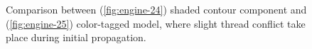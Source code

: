\documentclass[11pt, b5paper]{report}
\begin{document}
\begin{figure}[h!]
  \centering
  \caption[Comparison between shaded and color-tagged model]
  {Comparison between (\ref{fig:engine-24}) shaded contour component and 
    (\ref{fig:engine-25}) color-tagged model, where slight thread conflict
    take place during initial propagation.}
  \label{fig:shade-engine}
\end{figure}
\end{document}
